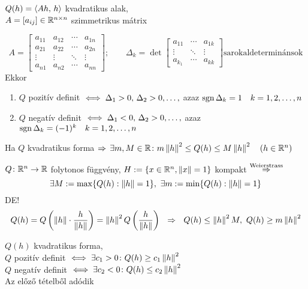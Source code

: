 \begin{te}$Q(h) = \langle Ah,\,h\rangle$ kvadratikus alak,\\$A=[a_{ij}]\in\mathbb{R}^{n\times n}$ szimmetrikus
  mátrix
  
  \[A=\begin{bmatrix}a_{11} & a_{12} & \cdots & a_{1n}\\
  a_{21} & a_{22} & \cdots & a_{2n}\\ \vdots & \vdots & \ddots & \vdots \\
  a_{n1} & a_{n2} & \cdots & a_{nn}\end{bmatrix};\qquad \Delta_k = \det\begin{bmatrix}a_{11}&\cdots&a_{1k}\\
  \vdots &\ddots& \vdots\\a_{k_1} & \cdots & a_{kk}\end{bmatrix} \text{sarokaldeterminánsok}\]
Ekkor
\begin{enumerate}
\item $Q$ pozitív definit $\iff\Delta_1>0,\,\Delta_2>0,\dotsc,$ azaz $\operatorname{sgn}\Delta_k=1\quad k=1,2,\dotsc,n$
\item $Q$ negatív definit $\iff\Delta_1<0,\,\Delta_2>0,\dotsc,$ azaz $\operatorname{sgn}\Delta_k=(-1)^k \quad k=1,2,\dotsc,n$
\end{enumerate}
\end{te}

\begin{te}
  Ha $Q$ kvadratikus forma $\Rightarrow\,\exists m,M\in\mathbb{R}\colon m\left\Vert h\right\Vert^2\leq Q(h)\leq M\left\Vert h\right\Vert^2\quad(h\in\mathbb{R}^n)$
\end{te}
\begin{biz}
  $Q\colon \mathbb{R}^n\to\mathbb{R}$ folytonos függvény, $H:=\{x\in\mathbb{R}^n,\left\Vert x\right\Vert = 1\}$ kompakt $\stackrel{\text{Weierstrass}}{\Rightarrow}$\\
  \[\exists M:=\max\{Q(h) : \norma h = 1\},\ \exists m:=\min\{Q(h) : \norma h = 1\}\]
  DE!\\
  \[Q(h) =  Q\left(\norma{h}\cdot\dfrac{h}{\norma{h}}\right) = \norma{h}^2Q\left(\dfrac{h}{\norma{h}}\right)\ \ \nn\ 
  \ Q(h)\leq \norma{h}^2 M,\ Q(h)\geq m\norma{h}^2\]
\end{biz}

\begin{kov}
  $Q(h)$ kvadratikus forma,\\
  $Q$ pozitív definit $\iff \exists c_1>0\colon Q(h)\geq c_1\left\Vert h\right\Vert^2$\\
  $Q$ negatív definit $\iff \exists c_2<0\colon Q(h)\leq c_2\left\Vert h\right\Vert^2$\\
  Az előző tételből adódik
\end{kov}

